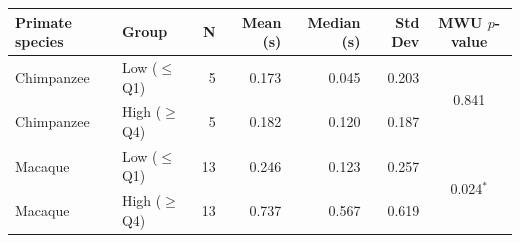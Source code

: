 \begin{tabular}{llrrrrc}
\toprule
\textbf{Primate species} & \textbf{Group} & \textbf{N} & \textbf{Mean (s)} & \textbf{Median (s)} & \textbf{Std Dev} & \textbf{MWU $p$-value} \\
\midrule
Chimpanzee & Low ($\leq$ Q1) & 5 & 0.173 & 0.045 & 0.203 & \multirow{2}{*}{0.841} \\
Chimpanzee & High ($\geq$ Q4) & 5 & 0.182 & 0.120 & 0.187 & \\
Macaque & Low ($\leq$ Q1) & 13 & 0.246 & 0.123 & 0.257 & \multirow{2}{*}{0.024$^*$} \\
Macaque & High ($\geq$ Q4) & 13 & 0.737 & 0.567 & 0.619 & \\
\bottomrule
\end{tabular}